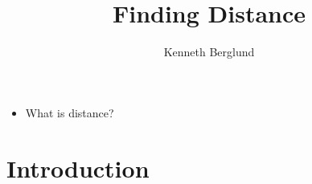 \documentclass[nooutcomes]{ximera}
\author{Kenneth Berglund}
\title{Finding Distance}
\begin{document}
\begin{abstract}
  
\end{abstract}
\maketitle

\begin{motivatingQuestions}\begin{itemize}
	\item What is distance?
\end{itemize}\end{motivatingQuestions}

\section{Introduction}
\end{document}
